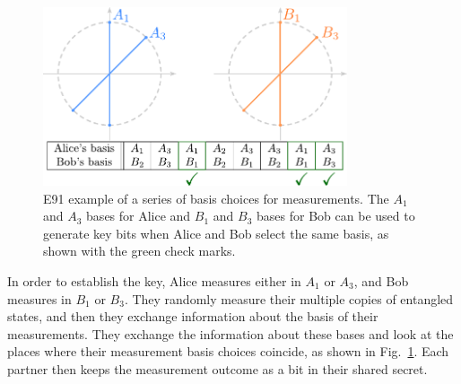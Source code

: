 \begin{figure}[H]
    \centering
    \includegraphics[width=0.8\textwidth]{lesson10/10-3-bases_key.pdf}
        \caption{E91 example of a series of basis choices for measurements.  The $A_1$ and $A_3$ bases for Alice and $B_1$ and $B_3$ bases for Bob can be used to generate key bits when Alice and Bob select the same basis, as shown with the green check marks.}
    \label{fig:e91-example}
\end{figure}

In order to establish the key, Alice measures either in $A_1$ or $A_3$, and Bob measures in $B_1$ or $B_3$. They randomly measure their multiple copies of entangled states, and then they exchange information about the basis of their measurements. 
They exchange the information about these bases and look at the places where their measurement basis choices coincide, as shown in Fig.~\ref{fig:e91-example}.  Each partner then keeps the measurement outcome as a bit in their shared secret.

